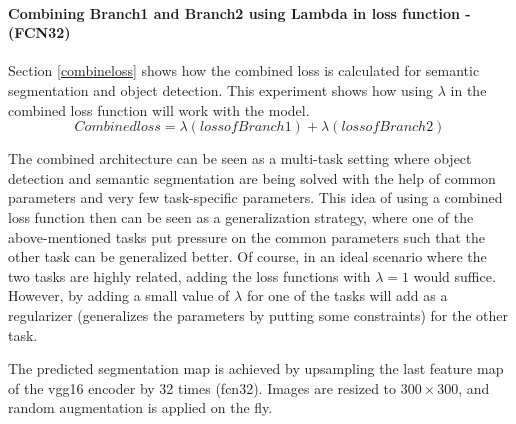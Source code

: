 \paragraph{Combining Branch1 and Branch2 using Lambda in loss function - (FCN32)}

Section \ref{combineloss} shows how the combined loss is calculated for semantic segmentation and object detection. This experiment shows how using $\lambda$ in the combined loss function will work with the model. 
\begin{equation}
    Combined loss = \lambda (loss of Branch1) + \lambda (loss of Branch2)
\end{equation}
\par
The combined architecture can be seen as a multi-task setting where object detection and semantic segmentation are being solved with the help of common parameters and very few task-specific parameters. This idea of using a combined loss function then can be seen as a generalization strategy, where one of the above-mentioned tasks put pressure on the common parameters such that the other task can be generalized better. Of course, in an ideal scenario where the two tasks are highly related, adding the loss functions with $\lambda = 1$ would suffice. However, by adding a small value of $\lambda$ for one of the tasks will add as a regularizer (generalizes the parameters by putting some constraints) for the other task.
\par
The predicted segmentation map is achieved by upsampling the last feature map of the \ac{vgg}16 encoder by 32 times (\ac{fcn}32). Images are resized to $300 \times 300$, and random augmentation is applied on the fly.

